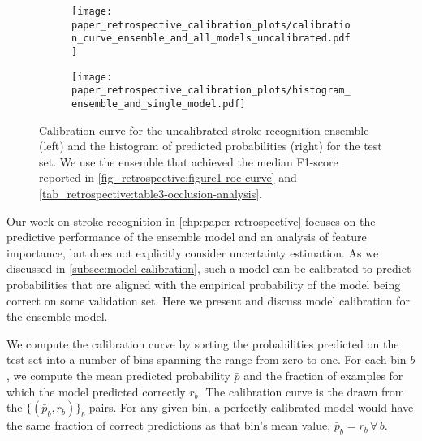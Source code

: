 \begin{figure}
    \begin{subfigure}[c]{0.48\columnwidth}
        \centering
        \texttt{[image: paper\_retrospective\_calibration\_plots/calibration\_curve\_ensemble\_and\_all\_models\_uncalibrated.pdf]}
    \end{subfigure}
    \begin{subfigure}[c]{0.48\columnwidth}
        \centering
        \texttt{[image: paper\_retrospective\_calibration\_plots/histogram\_ensemble\_and\_single\_model.pdf]}
    \end{subfigure}
    \caption[Calibration curve for the uncalibrated stroke recognition ensemble and empirical distribution of predicted probabilities.]{%
        Calibration curve for the uncalibrated stroke recognition ensemble (left) and the histogram of predicted probabilities (right) for the test set. 
        We use the ensemble that achieved the median F1-score reported in \cref{fig_retrospective:figure1-roc-curve} and \cref{tab_retrospective:table3-occlusion-analysis}.}
    \label{fig_discussion:retrospective-paper-calibration-curve-of-uncalibrated-model}
\end{figure}

Our work on stroke recognition in \cref{chp:paper-retrospective} focuses on the predictive performance of the ensemble model and an analysis of feature importance, but does not explicitly consider uncertainty estimation. 
As we discussed in \cref{subsec:model-calibration}, such a model can be calibrated to predict probabilities that are aligned with the empirical probability of the model being correct on some validation set. Here we present and discuss model calibration for the ensemble model. 

We compute the calibration curve by sorting the probabilities predicted on the test set into a number of bins spanning the range from zero to one. For each bin $b$, we compute the mean predicted probability $\bar{p}$ and the fraction of examples for which the model predicted correctly $r_{b}$. The calibration curve is the drawn from the $\{(\bar{p}_{b}, r_{b})\}_b$ pairs. For any given bin, a perfectly calibrated model would have the same fraction of correct predictions as that bin's mean value, $\bar{p}_{b} = r_{b}\,\forall\,b$. 

